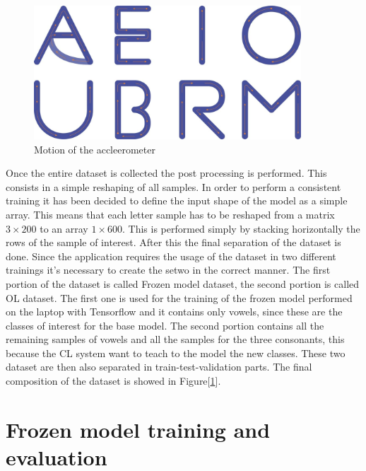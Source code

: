 \documentclass[12pt]{report}
\begin{document}
%
\begin{figure}[h!]
    \centering
    \includegraphics[width=100mm]{Figures/Chapter4/letters_motion.jpg} 
    \caption{Motion of the accleerometer}
    \label{fig:letters_motion}    
\end{figure}
%
Once the entire dataset is collected the post processing is performed. This consists in a simple reshaping of all samples. In order to perform a consistent training it has been decided to define the input shape of the model as a simple array. This means that each letter sample has to be reshaped from a matrix  $3 \times 200$ to an array $1 \times 600$. This is performed simply by stacking horizontally the rows of the sample of interest. After this the final separation of the dataset is done. Since the application requires the usage of the dataset in two different trainings it's necessary to create the setwo in the correct manner. The first portion of the dataset is called Frozen model dataset, the second portion is called OL dataset. The first one is used for the training of the frozen model performed on the laptop with Tensorflow and it contains only vowels, since these are the classes of interest for the base model. The second portion contains all the remaining samples of vowels and all the samples for the three consonants, this because the CL system want to teach to the model the new classes. These two dataset are then also separated in train-test-validation parts. The final composition of the dataset is showed in Figure[\ref{}].


\section{Frozen model training and evaluation}
\end{document}
